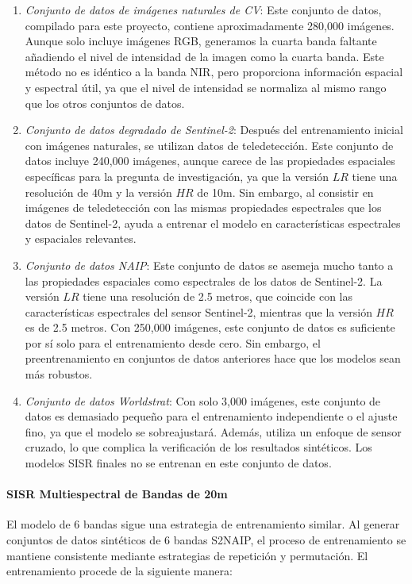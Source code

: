 \begin{enumerate}
    \item \textit{Conjunto de datos de imágenes naturales de CV}: Este conjunto de datos, compilado para este proyecto, contiene aproximadamente 280,000 imágenes. Aunque solo incluye imágenes RGB, generamos la cuarta banda faltante añadiendo el nivel de intensidad de la imagen como la cuarta banda. Este método no es idéntico a la banda NIR, pero proporciona información espacial y espectral útil, ya que el nivel de intensidad se normaliza al mismo rango que los otros conjuntos de datos.
    \item \textit{Conjunto de datos degradado de Sentinel-2}: Después del entrenamiento inicial con imágenes naturales, se utilizan datos de teledetección. Este conjunto de datos incluye 240,000 imágenes, aunque carece de las propiedades espaciales específicas para la pregunta de investigación, ya que la versión $LR$ tiene una resolución de 40m y la versión $HR$ de 10m. Sin embargo, al consistir en imágenes de teledetección con las mismas propiedades espectrales que los datos de Sentinel-2, ayuda a entrenar el modelo en características espectrales y espaciales relevantes.
    \item \textit{Conjunto de datos NAIP}: Este conjunto de datos se asemeja mucho tanto a las propiedades espaciales como espectrales de los datos de Sentinel-2. La versión $LR$ tiene una resolución de 2.5 metros, que coincide con las características espectrales del sensor Sentinel-2, mientras que la versión $HR$ es de 2.5 metros. Con 250,000 imágenes, este conjunto de datos es suficiente por sí solo para el entrenamiento desde cero. Sin embargo, el preentrenamiento en conjuntos de datos anteriores hace que los modelos sean más robustos.
    \item \textit{Conjunto de datos Worldstrat}: Con solo 3,000 imágenes, este conjunto de datos es demasiado pequeño para el entrenamiento independiente o el ajuste fino, ya que el modelo se sobreajustará. Además, utiliza un enfoque de sensor cruzado, lo que complica la verificación de los resultados sintéticos. Los modelos SISR finales no se entrenan en este conjunto de datos.
\end{enumerate}

\paragraph{SISR Multiespectral de Bandas de 20m}
El modelo de 6 bandas sigue una estrategia de entrenamiento similar. Al generar conjuntos de datos sintéticos de 6 bandas S2NAIP, el proceso de entrenamiento se mantiene consistente mediante estrategias de repetición y permutación. El entrenamiento procede de la siguiente manera:

